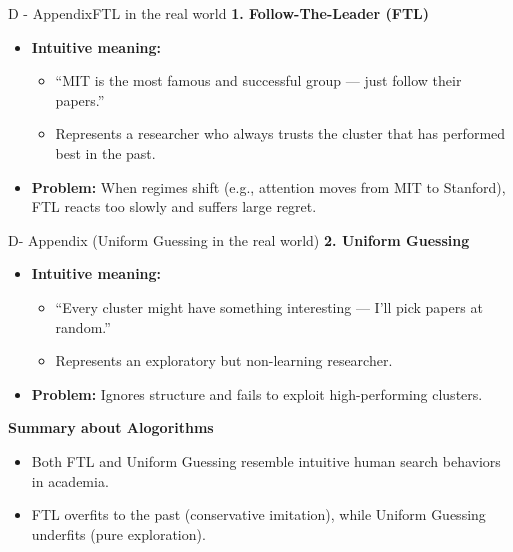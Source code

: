 \documentclass{beamer}
\begin{document}
\begin{frame}{D - Appendix{FTL in the real world}}
\textbf{1. Follow-The-Leader (FTL)}
    \begin{itemize}
        \item \textbf{Intuitive meaning:}
              \begin{itemize}
                  \item “MIT is the most famous and successful group — 
                        just follow their papers.”
                  \item Represents a researcher who always trusts 
                        the cluster that has performed best in the past.
              \end{itemize}
        \item \textbf{Problem:} 
              When regimes shift (e.g., attention moves from MIT to Stanford),
              FTL reacts too slowly and suffers large regret.
    \end{itemize}
\end{frame}

\begin{frame}{D- Appendix (Uniform Guessing in the real world)}
\textbf{2. Uniform Guessing}
    \begin{itemize}
        \item \textbf{Intuitive meaning:}
              \begin{itemize}
                  \item “Every cluster might have something interesting —
                        I’ll pick papers at random.”
                  \item Represents an exploratory but non-learning researcher.
              \end{itemize}
        \item \textbf{Problem:} 
              Ignores structure and fails to exploit high-performing clusters.
    \end{itemize}
\textbf{Summary about Alogorithms}
    \begin{itemize}
        \item Both FTL and Uniform Guessing resemble 
              intuitive human search behaviors in academia.
        \item FTL overfits to the past (conservative imitation),
              while Uniform Guessing underfits (pure exploration).
    \end{itemize}
\end{frame}
\end{document}

